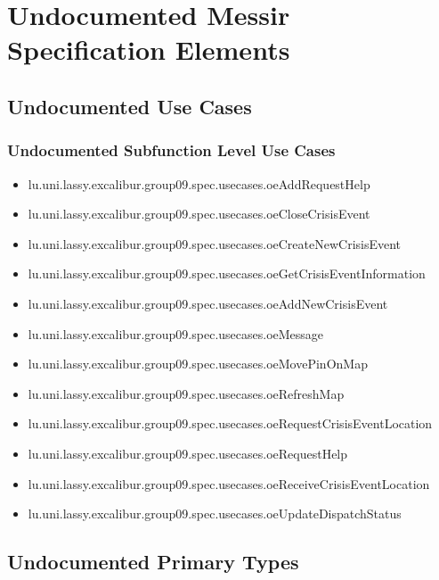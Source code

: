 	
\chapter{Undocumented Messir Specification Elements}


\section[Undocumented Use Cases]{Undocumented Use Cases}



\subsection[Undocumented Use Cases - Subfunction Level]{Undocumented Subfunction Level Use Cases}
\begin{itemize}
\item lu.uni.lassy.excalibur.group09.spec.usecases.oeAddRequestHelp 
\item lu.uni.lassy.excalibur.group09.spec.usecases.oeCloseCrisisEvent 
\item lu.uni.lassy.excalibur.group09.spec.usecases.oeCreateNewCrisisEvent 
\item lu.uni.lassy.excalibur.group09.spec.usecases.oeGetCrisisEventInformation 
\item lu.uni.lassy.excalibur.group09.spec.usecases.oeAddNewCrisisEvent 
\item lu.uni.lassy.excalibur.group09.spec.usecases.oeMessage 
\item lu.uni.lassy.excalibur.group09.spec.usecases.oeMovePinOnMap 
\item lu.uni.lassy.excalibur.group09.spec.usecases.oeRefreshMap 
\item lu.uni.lassy.excalibur.group09.spec.usecases.oeRequestCrisisEventLocation 
\item lu.uni.lassy.excalibur.group09.spec.usecases.oeRequestHelp 
\item lu.uni.lassy.excalibur.group09.spec.usecases.oeReceiveCrisisEventLocation 
\item lu.uni.lassy.excalibur.group09.spec.usecases.oeUpdateDispatchStatus 
\end{itemize}











\section[Undocumented Primary Types]{Undocumented Primary Types}



